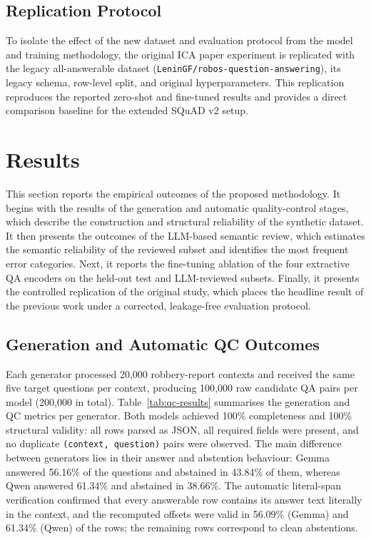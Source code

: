 \documentclass[graybox]{SNmult}
\begin{document}
\subsection{Replication Protocol}
\label{sec:paper-replication}

To isolate the effect of the new dataset and evaluation protocol from the
model and training methodology, the original ICA paper experiment is
replicated with the legacy all-answerable dataset
(\texttt{LeninGF/robos-question-answering}), its legacy schema, row-level
split, and original hyperparameters. This replication reproduces the reported
zero-shot and fine-tuned results and provides a direct comparison baseline for
the extended SQuAD v2 setup.

\section{Results}
\label{sec:results}

This section reports the empirical outcomes of the proposed methodology. It
begins with the results of the generation and automatic quality-control
stages, which describe the construction and structural reliability of the
synthetic dataset. It then presents the outcomes of the LLM-based semantic
review, which estimates the semantic reliability of the reviewed subset and
identifies the most frequent error categories. Next, it reports the
fine-tuning ablation of the four extractive QA encoders on the held-out test
and LLM-reviewed subsets. Finally, it presents the controlled replication of
the original study, which places the headline result of the previous work
under a corrected, leakage-free evaluation protocol.

\subsection{Generation and Automatic QC Outcomes}

Each generator processed 20{,}000 robbery-report contexts and received the
same five target questions per context, producing 100{,}000 raw candidate QA
pairs per model (200{,}000 in total). Table~\ref{tab:qc-results} summarises
the generation and QC metrics per generator. Both models achieved 100\%
completeness and 100\% structural validity: all rows parsed as JSON, all
required fields were present, and no duplicate \texttt{(context, question)}
pairs were observed. The main difference between generators lies in their
answer and abstention behaviour: Gemma answered 56.16\% of the questions and
abstained in 43.84\% of them, whereas Qwen answered 61.34\% and abstained in
38.66\%. The automatic literal-span verification confirmed that every
answerable row contains its answer text literally in the context, and the
recomputed offsets were valid in 56.09\% (Gemma) and 61.34\% (Qwen) of the
rows; the remaining rows correspond to clean abstentions.
\end{document}
